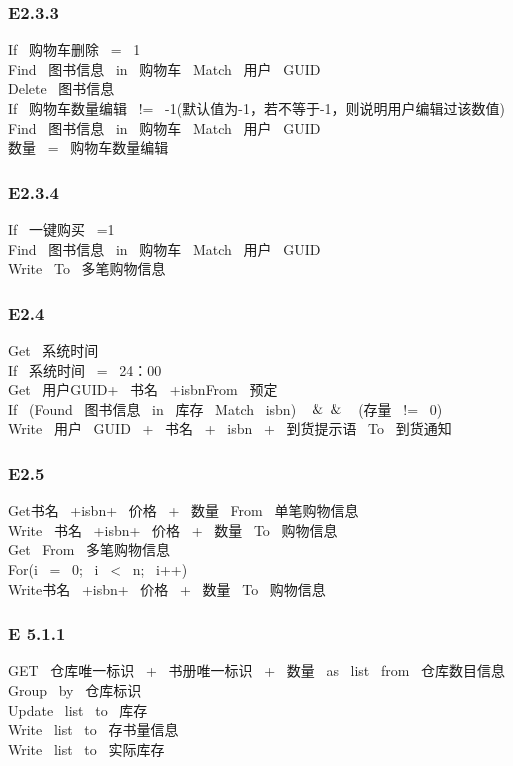 \subsubsection*{E2.3.3}
If \ 购物车删除 \ = \ 1\\ 
Find \ 图书信息 \ in \ 购物车 \ Match \ 用户 \ GUID\\ 
Delete \ 图书信息\\ 
If \ 购物车数量编辑 \ != \ -1(默认值为-1，若不等于-1，则说明用户编辑过该数值)\\ 
Find \ 图书信息 \ in \ 购物车 \ Match \ 用户 \ GUID \\ 
数量 \ = \ 购物车数量编辑\\ 
\vspace{-1mm}
\subsubsection*{E2.3.4}
If \ 一键购买 \ =1\\ 
Find \ 图书信息 \ in \ 购物车 \ Match \ 用户 \ GUID \\ 
Write \ To \ 多笔购物信息\\ 
\vspace{-1mm}
\subsubsection*{E2.4}
Get \ 系统时间\\ 
If \ 系统时间 \ = \ 24：00\\ 
Get \ 用户GUID+ \ 书名 \ +isbnFrom \ 预定\\ 
If \ (Found \ 图书信息 \ in \ 库存 \ Match \ isbn) \ $\And\And$ \ (存量 \ != \ 0)\\ 
Write \ 用户 \ GUID \ + \ 书名 \ + \ isbn \ + \ 到货提示语 \ To \ 到货通知\\ 
\vspace{-1mm}
\subsubsection*{E2.5}
Get书名 \ +isbn+ \ 价格 \ + \ 数量 \ From \ 单笔购物信息 \\ 
Write \ 书名 \ +isbn+ \ 价格 \ + \ 数量 \ To \ 购物信息\\ 
Get \ From \ 多笔购物信息\\ 
For(i \ = \ 0; \ i \ < \ n; \ i++)\\ 
Write书名 \ +isbn+ \ 价格 \ + \ 数量 \ To \ 购物信息\\ 
\subsubsection*{E 5.1.1}
GET \ 仓库唯一标识 \ + \ 书册唯一标识 \ + \ 数量 \ as \ list \ from \ 仓库数目信息 \\ 
Group \ by \ 仓库标识\\ 
Update \ list \ to \ 库存\\ 
Write \ list \ to \ 存书量信息\\ 
Write \ list \ to \ 实际库存\\ 
\vspace{-1mm}
